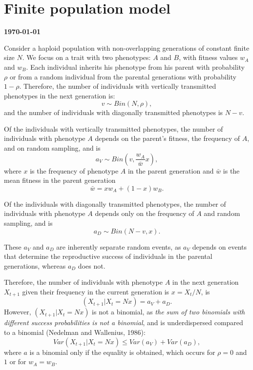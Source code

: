 \documentclass[11pt, oneside]{article}   	%
\begin{document}
\section*{Finite population model}
\textbf{\today}

Consider a haploid population with non-overlapping generations of constant finite size $N$.
We focus on a trait with two phenotypes: $A$ and $B$, with fitness values $w_A$ and $w_B$.
Each individual inherits his phenotype from his parent with probability $\rho$ or from a random individual from the parental generations with probability $1-\rho$.
Therefore, the number of individuals with vertically transmitted phenotypes in the next generation is:
\begin{equation}
v \sim Bin(N, \rho),
\end{equation}
and the number of individuals with diagonally transmitted phenotypes is $N-v$.

Of the individuals with vertically transmitted phenotypes, the number of individuals with phenotype $A$ depends on the parent's fitness, the frequency of $A$, and on random sampling, and is 
\begin{equation}
a_V \sim Bin(v, \frac{w_A}{\bar{w}} x),
\end{equation}
where $x$ is the frequency of phenotype $A$ in the parent generation and $\bar{w}$ is the mean fitness in the parent generation
\begin{equation}
\bar{w} = x w_A + (1-x) w_B.
\end{equation}

Of the individuals with diagonally transmitted phenotypes, the number of individuals with phenotype $A$ depends only on the frequency of $A$ and random sampling, and is 
\begin{equation}
a_D \sim Bin(N-v, x).
\end{equation}

These $a_V$ and $a_D$ are inherently separate random events, as $a_V$ depends on events that determine the reproductive success of individuals in the parental generations, whereas $a_D$ does not.

Therefore, the number of individuals with phenotype $A$ in the next generation $X_{t+1}$ given their frequency in the current generation is $x = X_t/N$, is
\begin{equation}
(X_{t+1}|X_t=Nx) = a_V + a_D.
\end{equation}
However, $(X_{t+1}|X_t=Nx)$ is not a binomial, as \textit{the sum of two binomials with different success probabilities is not a binomial}, and is underdispersed compared to a binomial (Nedelman and Wallenius, 1986):
\begin{equation}
Var(X_{t+1}|X_t=Nx) \le Var(a_V) + Var(a_D),
\end{equation}
where $a$ is a binomial only if the equality is obtained, which occurs for $\rho=0$ and $1$ or for $w_A=w_B$.
\end{document}

